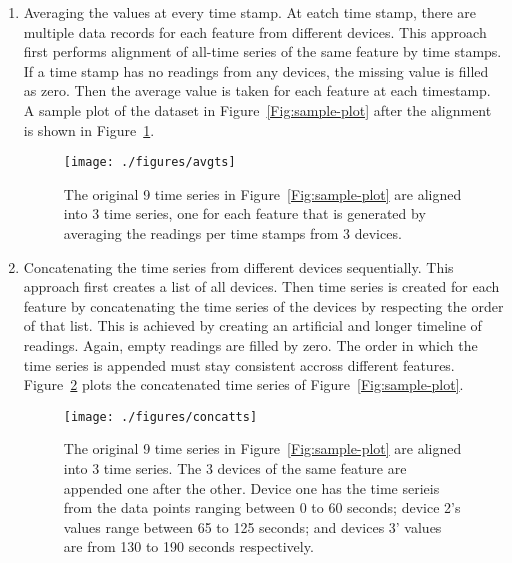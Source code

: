 \begin{enumerate}
	\item Averaging the values at every time stamp. At eatch time stamp, there are multiple data records for each feature from different devices. This approach first performs alignment of all-time series of the same feature by time stamps. If a time stamp has no readings from any devices, the missing value is filled as zero. Then the average value is taken for each feature at each timestamp. A sample plot of the dataset in Figure~\ref{Fig:sample-plot} after the alignment is shown in Figure~\ref{Fig:alignment-timeseries}.
	
	\begin{figure}
		\centering		
		\texttt{[image: ./figures/avgts]}
		\caption{ The original 9 time series in Figure~\ref{Fig:sample-plot} are aligned into 3 time series, one for each feature that is generated by averaging the readings per time stamps from 3 devices.}
		\label{Fig:alignment-timeseries}
	\end{figure}
	
	\item Concatenating the time series from different devices sequentially. This approach first creates a list of all devices. Then time series is created for each feature by concatenating the time series of the devices by respecting the order of that list. This is achieved by creating an artificial and longer timeline of readings. Again, empty readings are filled by zero. The order in which the time series is appended must stay consistent accross different features. Figure~\ref{Fig:alignment-concatenate} plots the concatenated time series of Figure~\ref{Fig:sample-plot}.
	
	\begin{figure}
		\begin{center}
		\texttt{[image: ./figures/concatts]}
		\caption{The original 9 time series in Figure~\ref{Fig:sample-plot} are aligned into 3 time series.  The 3 devices of the same feature are appended one after the other. Device one has the time serieis from the data points ranging between 0 to 60 seconds; device 2's values range between 65 to 125 seconds; and devices 3' values are from 130 to 190 seconds respectively.}
		\label{Fig:alignment-concatenate}
		\end{center}
	\end{figure}
	
\end{enumerate}


